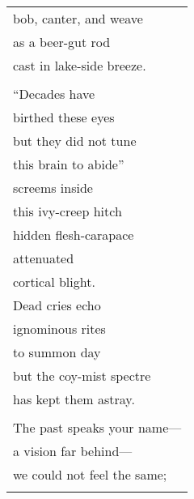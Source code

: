 \documentclass{article}
\begin{document}
\begin{center}
\begin{tabular}{l}
\hspace*{4em}bob, canter, and weave \\
as a beer-gut rod \\ %
\hspace*{2em}cast in lake-side breeze. \\
\\
\hspace*{6em}``Decades have \\
\hspace*{4em}birthed these eyes \\
\hspace*{2em}but they did not tune \\
this brain to abide'' \\
\hspace*{2em}screems inside \\
\hspace*{4em}this ivy-creep hitch \\
hidden flesh-carapace \\
\hspace*{2em}attenuated \\ %
\hspace*{4em}cortical blight. \\ %
Dead cries echo \\
\hspace*{2em}ignominous rites \\
to summon day \\
\hspace*{2em}but the coy-mist spectre \\
\hspace*{4em}has kept them astray. \\
\\
The past speaks your name--- \\
\hspace*{2em}a vision far behind--- \\
\hspace*{4em}we could not feel the same; \\
\\
\end{tabular}
\end{center}
\end{document}
